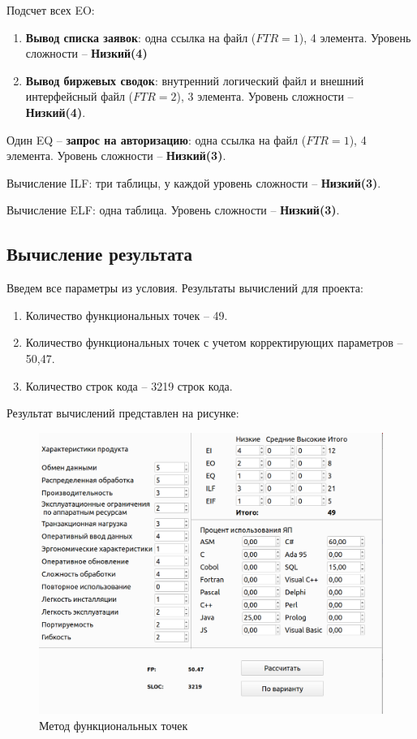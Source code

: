 Подсчет всех EO:
\begin{enumerate}
	\item \textbf{Вывод списка заявок}: одна ссылка на файл ($FTR = 1$), 4 элемента. Уровень сложности -- \textbf{Низкий(4)}
	\item \textbf{Вывод биржевых сводок}: внутренний логический файл и внешний интерфейсный файл ($FTR = 2$), 3 элемента. 
	Уровень сложности -- \textbf{Низкий(4)}.
\end{enumerate}

Один EQ -- \textbf{запрос на авторизацию}: одна ссылка на файл ($FTR = 1$), 4 элемента. Уровень сложности -- \textbf{Низкий(3)}.

Вычисление ILF: три таблицы, у каждой уровень сложности -- \textbf{Низкий(3)}.

Вычисление ELF: одна таблица. Уровень сложности -- \textbf{Низкий(3)}.

\subsection*{Вычисление результата}
Введем все параметры из условия.
Результаты вычислений для проекта:
\begin{enumerate}
	\item Количество функциональных точек -- 49.
	\item Количество функциональных точек с учетом корректирующих параметров -- 50,47.
	\item Количество строк кода -- 3219 строк кода.
\end{enumerate}

Результат вычислений представлен на рисунке:
\FloatBarrier
\begin{figure}[h]	
	\begin{center}
		\includegraphics[width=\linewidth]{inc/func.png}
	\end{center}
	\captionsetup{justification=centering}
	\caption{Метод функциональных точек}
\end{figure}
\FloatBarrier 

